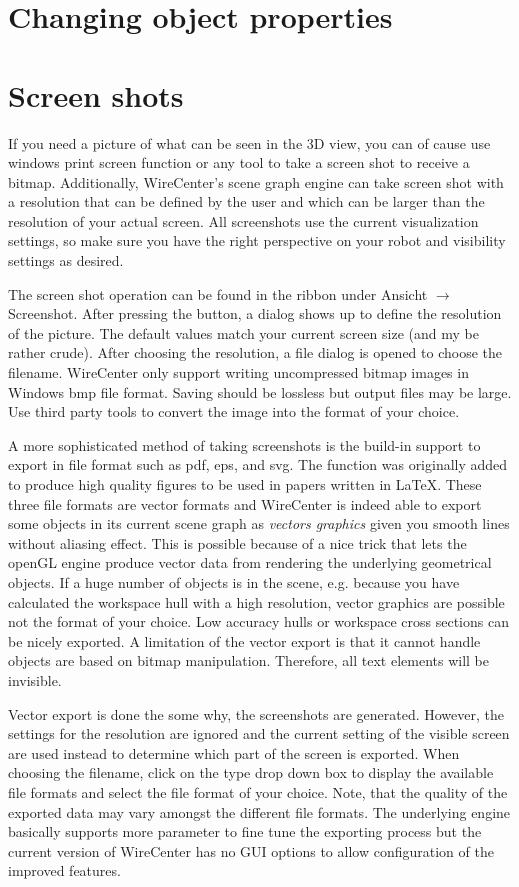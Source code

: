 \documentclass[11pt,a4paper,onepage,openany]{book}
\begin{document}
\section{Changing object properties}

\section{Screen shots}
If you need a picture of what can be seen in the 3D view, you can of cause
use windows print screen function or any tool to take a screen shot to
receive a bitmap. Additionally, WireCenter's scene graph engine can take
screen shot with a resolution that can be defined by the user and which can
be larger than the resolution of your actual screen. All screenshots use the
current visualization settings, so make sure you have the right perspective
on your robot and visibility settings as desired.

The screen shot operation can be found in the ribbon under Ansicht
$\rightarrow$ Screenshot. After pressing the button, a dialog shows up to
define the resolution of the picture. The default values match your current
screen size (and my be rather crude). After choosing the resolution, a file
dialog is opened to choose the filename. WireCenter only support writing
uncompressed bitmap images in Windows bmp file format. Saving should be
lossless but output files may be large. Use third party tools to convert the
image into the format of your choice.

A more sophisticated method of taking screenshots is the build-in support to
export in file format such as pdf, eps, and svg. The function was originally
added to produce high quality figures to be used in papers written in LaTeX.
These three file formats are vector formats and WireCenter is indeed able to
export some objects in its current scene graph as \emph{vectors graphics}
given you smooth lines without aliasing effect. This is possible because of a
nice trick that lets the openGL engine produce vector data from rendering the
underlying geometrical objects. If a huge number of objects is in the scene,
e.g. because you have calculated the workspace hull with a high resolution,
vector graphics are possible not the format of your choice. Low accuracy
hulls or workspace cross sections can be nicely exported. A limitation of the
vector export is that it cannot handle objects are based on bitmap
manipulation. Therefore, all text elements will be invisible.

Vector export is done the some why, the screenshots are generated. However,
the settings for the resolution are ignored and the current setting of the
visible screen are used instead to determine which part of the screen is
exported. When choosing the filename, click on the type drop down box to
display the available file formats and select the file format of your choice.
Note, that the quality of the exported data may vary amongst the different
file formats. The underlying engine basically supports more parameter to fine
tune the exporting process but the current version of WireCenter has no GUI
options to allow configuration of the improved features.
\end{document}
